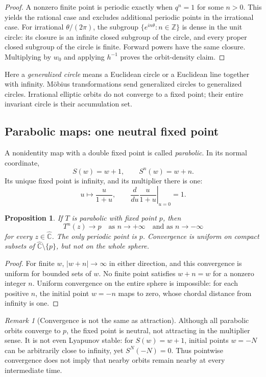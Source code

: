 \documentclass[11pt,a4paper]{article}
\newcommand{\Z}{\mathbb{Z}}
\newcommand{\Chat}{\widehat{\mathbb{C}}}
\newcommand{\abs}[1]{\left|#1\right|}
\theoremstyle{plain}
\newtheorem{proposition}[theorem]{Proposition}
\theoremstyle{definition}
\theoremstyle{remark}
\newtheorem{remark}[theorem]{Remark}
\begin{document}
\begin{proof}
A nonzero finite point is periodic exactly when $q^n=1$ for some $n>0$.
This yields the rational case and excludes additional periodic points in
the irrational case. For irrational $\theta/(2\pi)$, the subgroup
$\{e^{in\theta}:n\in\Z\}$ is dense in the unit circle: its closure is
an infinite closed subgroup of the circle, and every proper closed subgroup
of the circle is finite. Forward powers have the same closure. Multiplying
by $w_0$ and applying $h^{-1}$ proves the orbit-density claim.
\end{proof}

Here a \emph{generalized circle} means a Euclidean circle or a Euclidean
line together with infinity. M\"obius transformations send generalized
circles to generalized circles. Irrational elliptic orbits do not converge
to a fixed point; their entire invariant circle is their accumulation set.

\subsection{Parabolic maps: one neutral fixed point}

A nonidentity map with a double fixed point is called \emph{parabolic}.
In its normal coordinate,
\[
  S(w)=w+1,\qquad S^n(w)=w+n.
\]
Its unique fixed point is infinity, and its multiplier there is one:
\[
  u\longmapsto\frac{u}{1+u},\qquad
  \left.\frac{d}{du}\frac{u}{1+u}\right|_{u=0}=1.
\]

\begin{proposition}
If $T$ is parabolic with fixed point $p$, then
\[
  T^n(z)\longrightarrow p\quad\text{as }n\to+\infty
  \quad\text{and as }n\to-\infty
\]
for every $z\in\Chat$. The only periodic point is $p$. Convergence is
uniform on compact subsets of $\Chat\setminus\{p\}$, but not on
the whole sphere.
\end{proposition}

\begin{proof}
For finite $w$, $\abs{w+n}\to\infty$ in either direction, and this
convergence is uniform for bounded sets of $w$. No finite point satisfies
$w+n=w$ for a nonzero integer $n$. Uniform convergence on the entire sphere
is impossible: for each positive $n$, the initial point $w=-n$ maps to zero,
whose chordal distance from infinity is one.
\end{proof}

\begin{remark}[Convergence is not the same as attraction]
Although all parabolic orbits converge to $p$, the fixed point is neutral,
not attracting in the multiplier sense. It is not even Lyapunov stable:
for $S(w)=w+1$, initial points $w=-N$ can be arbitrarily close to infinity,
yet $S^N(-N)=0$. Thus pointwise convergence does not imply that nearby
orbits remain nearby at every intermediate time.
\end{remark}
\end{document}

